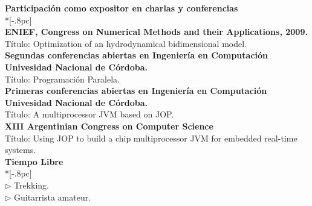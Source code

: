 \documentclass[a4paper,11pt,english]{article}
\begin{document}
{\large \bf Participaci\'on como expositor en charlas y conferencias} \\*[-.8pc]
\underline{\hspace{6in}} \\
{\bf  ENIEF, Congress on Numerical Methods and their Applications, 2009.}\\
T\'itulo: Optimization of an hydrodynamical bidimensional model. 
\\
{\bf  Segundas conferencias abiertas en Ingenier\'ia en Computaci\'on Univesidad Nacional de C\'ordoba.}\\
T\'itulo: Programaci\'on Paralela.
\\
{\bf  Primeras conferencias abiertas en Ingenier\'ia en Computaci\'on Univesidad Nacional de C\'ordoba.}\\
T\'itulo: A multiprocessor JVM based on JOP.
\\
{{\bf  XIII Argentinian Congress on Computer Science}\\
T\'itulo: Using JOP to build a chip multiprocessor JVM for embedded real-time systems.}
\\

{\large \bf Tiempo Libre} \\*[-.8pc]
\underline{\hspace{6in}} \\
$\triangleright$ Trekking.\\
$\triangleright$ Guitarrista amateur.\\
\\
\end{document}
